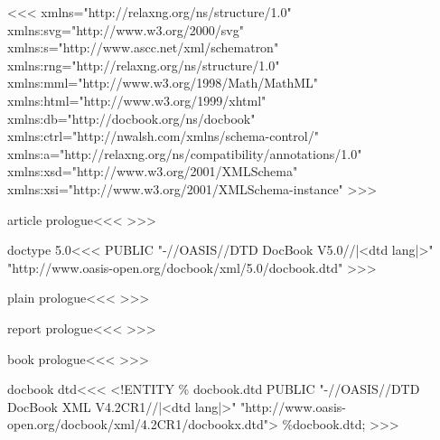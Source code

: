 \<\><<<
xmlns="http://relaxng.org/ns/structure/1.0"                  \Hnewline  
xmlns:svg="http://www.w3.org/2000/svg"                       \Hnewline  
xmlns:s="http://www.ascc.net/xml/schematron"                 \Hnewline  
xmlns:rng="http://relaxng.org/ns/structure/1.0"              \Hnewline  
xmlns:mml="http://www.w3.org/1998/Math/MathML"               \Hnewline  
xmlns:html="http://www.w3.org/1999/xhtml"                    \Hnewline  
xmlns:db="http://docbook.org/ns/docbook"                     \Hnewline  
xmlns:ctrl="http://nwalsh.com/xmlns/schema-control/"         \Hnewline  
xmlns:a="http://relaxng.org/ns/compatibility/annotations/1.0"\Hnewline  
xmlns:xsd="http://www.w3.org/2001/XMLSchema"                 \Hnewline  
xmlns:xsi="http://www.w3.org/2001/XMLSchema-instance"        \Hnewline  
>>>




\<article prologue\><<<
  {}
   {}
>>>

\<doctype 5.0\><<<
PUBLIC "-//OASIS//DTD DocBook V5.0//|<dtd lang|>"\Hnewline
       "http://www.oasis-open.org/docbook/xml/5.0/docbook.dtd"
>>>





\<plain prologue\><<<
   {}
   {}
>>>




\<report prologue\><<<
   {}
   {}
>>>




\<book prologue\><<<
   {}
   {}
>>>


\<docbook dtd\><<<
<!ENTITY \% docbook.dtd PUBLIC\Hnewline
    "-//OASIS//DTD DocBook XML V4.2CR1//|<dtd lang|>"\Hnewline
       "http://www.oasis-open.org/docbook/xml/4.2CR1/docbookx.dtd">
\Hnewline \%docbook.dtd; \Hnewline
>>>


